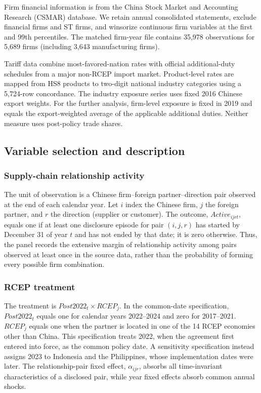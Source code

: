 \documentclass[preprint,12pt,authoryear]{elsarticle}
\begin{document}
Firm financial information is from the China Stock Market and Accounting Research (CSMAR) database. We retain annual consolidated statements, exclude financial firms and ST firms, and winsorize continuous firm variables at the first and 99th percentiles. The matched firm-year file contains 35,978 observations for 5,689 firms (including 3,643 manufacturing firms).

Tariff data combine most-favored-nation rates with official additional-duty schedules from a major non-RCEP import market. Product-level rates are mapped from HS8 products to two-digit national industry categories using a 5,724-row concordance. The industry exposure series uses fixed 2016 Chinese export weights. For the further analysis, firm-level exposure is fixed in 2019 and equals the export-weighted average of the applicable additional duties. Neither measure uses post-policy trade shares.

\subsection{Variable selection and description}

\subsubsection{Supply-chain relationship activity}

The unit of observation is a Chinese firm--foreign partner--direction pair observed at the end of each calendar year. Let $i$ index the Chinese firm, $j$ the foreign partner, and $r$ the direction (supplier or customer). The outcome, $Active_{ijrt}$, equals one if at least one disclosure episode for pair $(i,j,r)$ has started by December 31 of year $t$ and has not ended by that date; it is zero otherwise. Thus, the panel records the extensive margin of relationship activity among pairs observed at least once in the source data, rather than the probability of forming every possible firm combination.

\subsubsection{RCEP treatment}

The treatment is $Post2022_t\times RCEP_j$. In the common-date specification, $Post2022_t$ equals one for calendar years 2022--2024 and zero for 2017--2021. $RCEP_j$ equals one when the partner is located in one of the 14 RCEP economies other than China. This specification treats 2022, when the agreement first entered into force, as the common policy date. A sensitivity specification instead assigns 2023 to Indonesia and the Philippines, whose implementation dates were later. The relationship-pair fixed effect, $\alpha_{ijr}$, absorbs all time-invariant characteristics of a disclosed pair, while year fixed effects absorb common annual shocks.
\end{document}
